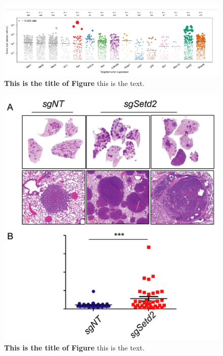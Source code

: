 \begin{figure}
\hypertarget{fig:06}{%
\centering
\includegraphics[width=1\textwidth,height=\textheight]{images/tuba3.png}
\caption{\textbf{This is the title of Figure} this is the text.}\label{fig:06}
}
\end{figure}

\begin{figure}
\hypertarget{fig:07}{%
\centering
\includegraphics[width=1\textwidth,height=\textheight]{images/tuba4.png}
\caption{\textbf{This is the title of Figure} this is the text.}\label{fig:07}
}
\end{figure}

